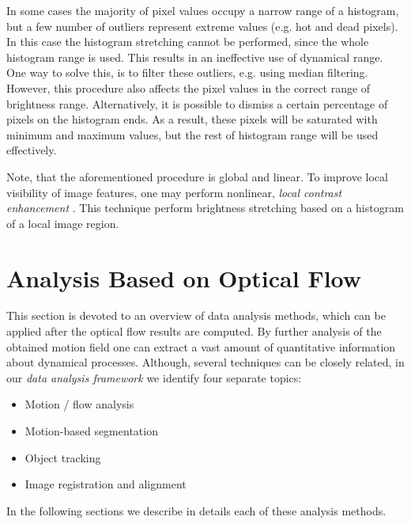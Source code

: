 In some cases the majority of pixel values occupy a narrow range of a histogram, but a few number of outliers represent extreme values (e.g. hot and dead pixels). In this case the histogram stretching cannot be performed, since the whole histogram range is used. This results in an ineffective use of dynamical range. One way to solve this, is to filter these outliers, e.g. using median filtering. However, this procedure also affects the pixel values in the correct range of brightness range. Alternatively, it is possible to dismiss a certain percentage of pixels on the histogram ends. As a result, these pixels will be saturated with minimum and maximum values, but the rest of histogram range will be used effectively. 

Note, that the aforementioned procedure is global and linear. To improve local visibility of image features, one may perform nonlinear, \textit{local contrast enhancement} \cite{Pizer87}. This technique perform brightness stretching based on a histogram of a local image region.    



%




\section{Analysis Based on Optical Flow}
\label{data_analysis}



This section is devoted to an overview of data analysis methods, which can be applied after the optical flow results are computed. By further analysis of the obtained motion field one can extract a vast amount of quantitative information about dynamical processes. Although, several techniques can be closely related, in our \textit{data analysis framework} we identify four separate topics:
\begin{itemize}
	\item Motion / flow analysis 
	\item Motion-based segmentation
	\item Object tracking
	\item Image registration and alignment
	
\end{itemize}
In the following sections we describe in details each of these analysis methods.
   

